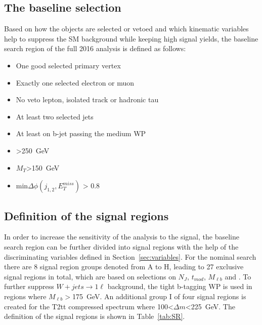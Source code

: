 



\subsection{The baseline selection~\label{sec:baseline}}

Based on how the objects are selected or vetoed and  which kinematic variables help to suppress the SM background while keeping high signal yields, the baseline search region of the full 2016 analysis is defined as follows:

\begin{itemize}
\item One good selected primary vertex
\item Exactly one selected electron or muon
\item No veto lepton, isolated track or hadronic tau
\item At least two selected jets
\item At least on b-jet passing the medium WP 
\item \MET>250~GeV
\item $M_{T}$>150~GeV
\item min$\Delta \phi (j_{1,2}, E_{T}^{miss})$ > 0.8
\end{itemize}


\subsection{Definition of the signal regions~\label{sec:sr}}

In order to increase the sensitivity of the analysis to the signal, the baseline search region can be further divided into signal regions with the help of the discriminating variables defined in Section~\ref{sec:variables}. For the nominal search there are 8 signal region groups denoted from A to H, leading to 27 exclusive signal regions in total, which are based on selections on $N_{J}$, $t_{mod}$, $M_{\ell b}$ and \MET. To further suppress $W+jets \to 1\ell$ background, the tight b-tagging WP is used in regions where $M_{\ell b}>$175~GeV.  An additional group I of four signal regions is created for the T2tt compressed spectrum where 100<$\Delta m$<225~GeV. The definition of the signal regions is shown in Table~\ref{tab:SR}.


